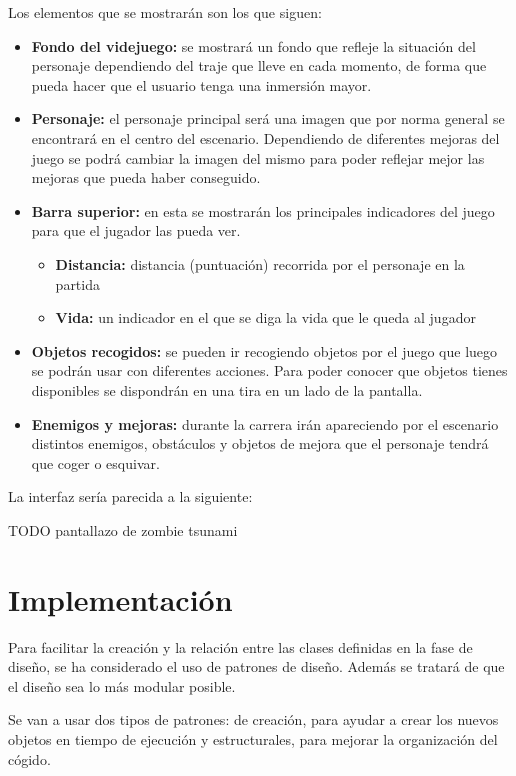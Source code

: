 \documentclass[palatino]{apuntes}
\begin{document}
Los elementos que se mostrarán son los que siguen:
\begin{itemize}
	\item \textbf{Fondo del videjuego:} se mostrará un fondo que refleje la situación del personaje dependiendo del traje que lleve en cada momento, de forma que pueda hacer que el usuario tenga una inmersión mayor.
	\item \textbf{Personaje:} el personaje principal será una imagen que por norma general se encontrará en el centro del escenario. Dependiendo de diferentes mejoras del juego se podrá cambiar la imagen del mismo para poder reflejar mejor las mejoras que pueda haber conseguido.
	\item \textbf{Barra superior:} en esta se mostrarán los principales indicadores del juego para que el jugador las pueda ver.
		\begin{itemize}
			\item \textbf{Distancia:} distancia (puntuación) recorrida por el personaje en la partida
			\item \textbf{Vida:} un indicador en el que se diga la vida que le queda al jugador
		\end{itemize}
	\item \textbf{Objetos recogidos:} se pueden ir recogiendo objetos por el juego que luego se podrán usar con diferentes acciones. Para poder conocer que objetos tienes disponibles se dispondrán en una tira en un lado de la pantalla.
	
	\item \textbf{Enemigos y mejoras:} durante la carrera irán apareciendo por el escenario distintos enemigos, obstáculos y objetos de mejora que el personaje tendrá que coger o esquivar.
\end{itemize}

La interfaz sería parecida a la siguiente:

TODO pantallazo de zombie tsunami


\chapter{Implementación}
Para facilitar la creación y la relación entre las clases definidas en la fase de diseño, se ha considerado el uso de patrones de diseño. Además se tratará de que el diseño sea lo más modular posible.

Se van a usar dos tipos de patrones: de creación, para ayudar a crear los nuevos objetos en tiempo de ejecución y estructurales, para mejorar la organización del cógido.
\end{document}
